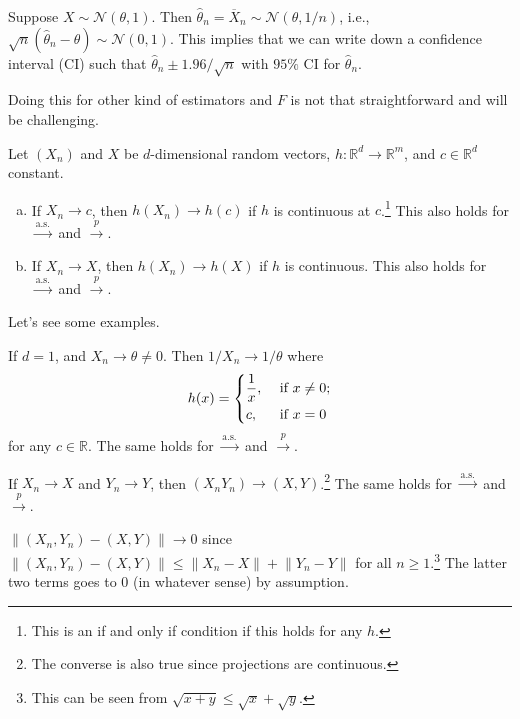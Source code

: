 \begin{eg}
	Suppose \(X \sim \mathcal{N} (\theta , 1)\). Then \(\hat{\theta} _n = \overline{X} _n \sim \mathcal{N} (\theta , 1 / n)\), i.e., \(\sqrt{n} (\hat{\theta} _n - \theta ) \sim \mathcal{N} (0, 1)\). This implies that we can write down a confidence interval (CI) such that \(\hat{\theta} _n \pm 1.96 / \sqrt{n} \) with \(95\%\) CI for \(\hat{\theta} _n\).
\end{eg}

Doing this for other kind of estimators and \(F\) is not that straightforward and will be challenging.

\begin{remark}
	Let \((X_n)\) and \(X\) be \(d\)-dimensional random vectors, \(h \colon \mathbb{R} ^d \to \mathbb{R} ^m\), and \(c \in \mathbb{R} ^d\) constant.
	\begin{enumerate}[(a)]
		\item If \(X_n \to c\), then \(h(X_n) \to h(c)\) if \(h\) is continuous at \(c\).\footnote{This is an if and only if condition if this holds for any \(h\).} This also holds for \(\overset{\text{a.s.} }{\to } \) and \(\overset{p}{\to } \).
		\item If \(X_n \to X\), then \(h(X_n) \to h(X)\) if \(h\) is continuous. This also holds for \(\overset{\text{a.s.} }{\to }\) and \(\overset{p}{\to } \).
	\end{enumerate}
\end{remark}

Let's see some examples.

\begin{eg}
	If \(d = 1\), and \(X_n \to \theta \neq 0\). Then \(1 / X_n \to 1 / \theta \) where
	\[
		h(x) = \begin{dcases}
			\frac{1}{x}, & \text{ if } x \neq 0 ; \\
			c,           & \text{ if } x = 0
		\end{dcases}
	\]
	for any \(c \in \mathbb{R} \). The same holds for \(\overset{\text{a.s.} }{\to }\) and \(\overset{p}{\to } \).
\end{eg}

\begin{eg}
	If \(X_n \to X\) and \(Y_n \to Y\), then \((X_n Y_n) \to (X, Y)\).\footnote{The converse is also true since projections are continuous.} The same holds for \(\overset{\text{a.s.} }{\to } \) and \(\overset{p}{\to } \).
\end{eg}
\begin{explanation}
	\(\lVert (X_n, Y_n) - (X, Y) \rVert \to 0\) since \(\lVert (X_n, Y_n ) - (X, Y) \rVert \leq \lVert X_n - X \rVert + \lVert Y_n - Y \rVert\) for all \(n \geq 1\).\footnote{This can be seen from \(\sqrt{x + y} \leq \sqrt{x} + \sqrt{y} \).} The latter two terms goes to \(0\) (in whatever sense) by assumption.
\end{explanation}